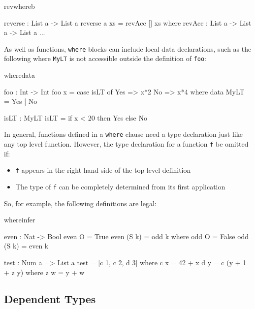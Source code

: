 \begin{SaveVerbatim}{revwhereb}

reverse : List a -> List a
reverse {a} xs = revAcc [] xs where
  revAcc : List a -> List a -> List a
  ...

\end{SaveVerbatim}

\noindent
As well as functions, \texttt{where} blocks can include local data
declarations, such as the following where \texttt{MyLT} is not accessible outside
the definition of \texttt{foo}:

\begin{SaveVerbatim}{wheredata}

foo : Int -> Int
foo x = case isLT of
            Yes => x*2
            No => x*4
    where
       data MyLT = Yes | No

       isLT : MyLT
       isLT = if x < 20 then Yes else No

\end{SaveVerbatim}

\noindent
In general, functions defined in a \texttt{where} clause need a type declaration
just like any top level function. However, the type declaration for
a function \texttt{f}  be omitted if:

\begin{itemize}
\item \texttt{f} appears in the right hand side of the top level definition 
\item The type of \texttt{f} can be completely determined from its first
application
\end{itemize}

\noindent
So, for example, the following definitions are legal:

\begin{SaveVerbatim}{whereinfer}

even : Nat -> Bool 
even O = True 
even (S k) = odd k where 
  odd O = False 
  odd (S k) = even k 

test : Num a => List a 
test = [c 1, c 2, d 3] 
  where c x = 42 + x 
        d y = c (y + 1 + z y) 
           where z w = y + w 

\end{SaveVerbatim}


\subsection{Dependent Types}

